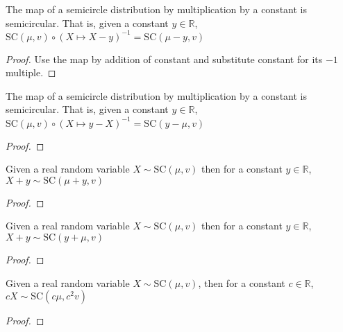 \begin{lemma}\label{lem:semicircleReal_map_sub_const}
  \mathlibok
   The map of a semicircle distribution by multiplication by a constant is semicircular. That is,
  given a constant $y \in \mathbb{R}$, $ \mathrm{SC}(\mu, v) \circ (X  \mapsto X - y )^{-1} = \mathrm{SC}(\mu - y  , v)$
  \begin{proof}
   Use the map by addition of constant and substitute constant for its $-1$ multiple.
  \end{proof}
\end{lemma}


\begin{lemma}\label{lem:semicircleReal_map_const_sub}
  \mathlibok
  The map of a semicircle distribution by multiplication by a constant is semicircular. That is,
  given a constant $y \in \mathbb{R}$, $ \mathrm{SC}(\mu, v) \circ (X \mapsto y-X  )^{-1} = \mathrm{SC}(y-\mu  , v)$
  \begin{proof}

  \end{proof}
\end{lemma}


\begin{lemma}\label{lem:semicircleReal_add_const}
  \mathlibok
  Given a real random variable $X \sim \mathrm{SC}(\mu, v)$
  then for a constant $y \in \mathbb{R}$, $X + y \sim \mathrm{SC}(\mu + y, v)$
  \begin{proof}
  \end{proof}
\end{lemma}


\begin{lemma}\label{lem:semicircleReal_const_add}
  \mathlibok
  Given a real random variable $X \sim \mathrm{SC}(\mu, v)$
  then for a constant $y \in \mathbb{R}$, $X + y \sim \mathrm{SC}(y + \mu, v)$
  \begin{proof}

  \end{proof}
\end{lemma}


\begin{lemma}\label{lem:semicircleReal_const_mul}
  \mathlibok
  Given a real random variable $X \sim \mathrm{SC}(\mu, v)$,
  then for a constant $c \in \mathbb{R}$, $cX \sim \mathrm{SC}(c\mu , c^2v)$
  \begin{proof}

  \end{proof}
\end{lemma}



